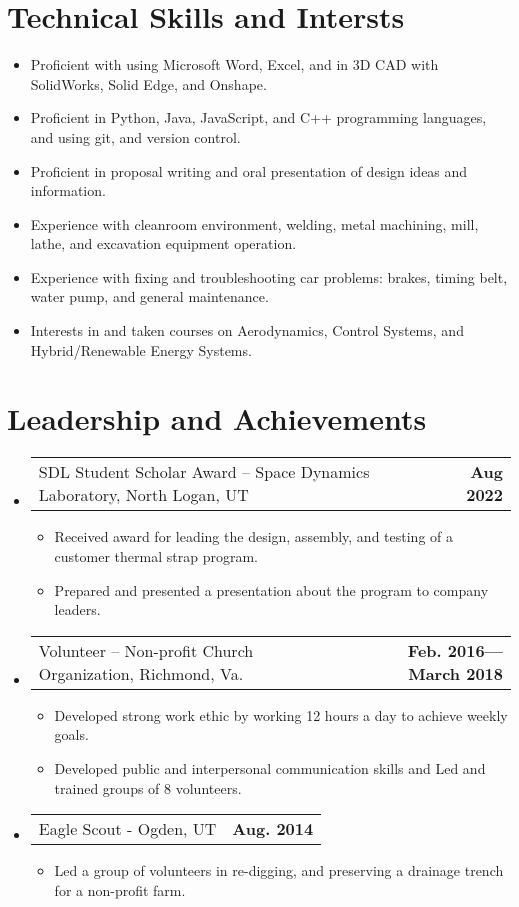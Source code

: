 \documentclass[letterpaper,11pt]{article}
\makeatletter
\newcommand{\resumeProjectHeading}[2]{
    \vspace{-6pt}
    \item
    \begin{tabular*}{1.0\textwidth}{l@{\extracolsep{\fill}}r}
      \small#1 & \textbf{\small #2}\\
    \end{tabular*}\vspace{-11pt}
}
\newcommand{\resumeSubHeadingListStart}{\begin{itemize}[leftmargin=0.0in, label={}]}
\newcommand{\resumeSubHeadingListEnd}{\end{itemize}}
\newcommand{\resumeItemListStart}{\begin{itemize}}
\newcommand{\resumeItemListEnd}{\end{itemize}\vspace{-5pt}}
\newcommand{\resumeItem}[1]{ 
  \item\small{
    {#1 \vspace{-5pt}}
  }
}
\makeatother
\begin{document}
\section{Technical Skills and Intersts}
    \resumeItemListStart{}
        \resumeItem{Proficient with using Microsoft Word, Excel, and in 3D CAD with SolidWorks, Solid Edge, and Onshape.} \vspace{-4.5pt}
        \resumeItem{Proficient in Python, Java, JavaScript, and C++ programming languages, and using git, and version control.} \vspace{-4.5pt}
        \resumeItem{Proficient in proposal writing and oral presentation of design ideas and information.} \vspace{-4.5pt}
        \resumeItem{Experience with cleanroom environment, welding, metal machining, mill, lathe, and excavation equipment operation.} \vspace{-4.5pt}
        \resumeItem{Experience with fixing and troubleshooting car problems: brakes, timing belt, water pump, and general maintenance.} \vspace{-4.5pt}
        \resumeItem{Interests in and taken courses on Aerodynamics, Control Systems, and Hybrid/Renewable Energy Systems.} \vspace{-4.5pt}
    \resumeItemListEnd{}
 
\vspace{-8pt}

\section{Leadership and Achievements }
    \resumeSubHeadingListStart{}
    \resumeProjectHeading{SDL Student Scholar Award – Space Dynamics Laboratory, North Logan, UT	}{Aug 2022}
      \resumeItemListStart{}
        \resumeItem{Received award for leading the design, assembly, and testing of a customer thermal strap program.}
        \resumeItem{Prepared and presented a presentation about the program to company leaders.}
      \resumeItemListEnd{}
    \resumeProjectHeading{Volunteer – Non-profit Church Organization, Richmond, Va.}{Feb. 2016—March 2018}
      \resumeItemListStart{}
        \resumeItem{Developed strong work ethic by working 12 hours a day to achieve weekly goals.}
        \resumeItem{Developed public and interpersonal communication skills and Led and trained groups of 8 volunteers.}
      \resumeItemListEnd{}
    \resumeProjectHeading{Eagle Scout - Ogden, UT}{Aug. 2014}
      \resumeItemListStart{}
        \resumeItem{Led a group of volunteers in re-digging, and preserving a drainage trench for a non-profit farm.}
      \resumeItemListEnd{}

    \resumeSubHeadingListEnd{}
\vspace{-16pt}
\end{document}
